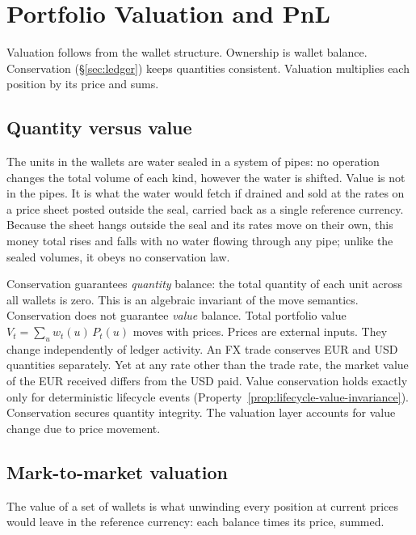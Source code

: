 \section{Portfolio Valuation and PnL}
\label{sec:valuation}

Valuation follows from the wallet structure. Ownership is wallet balance. Conservation (\S\ref{sec:ledger}) keeps quantities consistent. Valuation multiplies each position by its price and sums.

\subsection{Quantity versus value}

\begin{mentalmodel}
The units in the wallets are water sealed in a system of pipes: no operation changes the total volume of each kind, however the water is shifted. Value is not in the pipes. It is what the water would fetch if drained and sold at the rates on a price sheet posted outside the seal, carried back as a single reference currency. Because the sheet hangs outside the seal and its rates move on their own, this money total rises and falls with no water flowing through any pipe; unlike the sealed volumes, it obeys no conservation law.
\end{mentalmodel}

Conservation guarantees \emph{quantity} balance: the total quantity of each unit across all wallets is zero. This is an algebraic invariant of the move semantics. Conservation does not guarantee \emph{value} balance. Total portfolio value $V_t = \sum_u w_t(u)\,P_t(u)$ moves with prices. Prices are external inputs. They change independently of ledger activity. An FX trade conserves EUR and USD quantities separately. Yet at any rate other than the trade rate, the market value of the EUR received differs from the USD paid. Value conservation holds exactly only for deterministic lifecycle events (Property~\ref{prop:lifecycle-value-invariance}). Conservation secures quantity integrity. The valuation layer accounts for value change due to price movement.

\subsection{Mark-to-market valuation}

\noindent The value of a set of wallets is what unwinding every position at current prices would leave in the reference currency: each balance times its price, summed.

